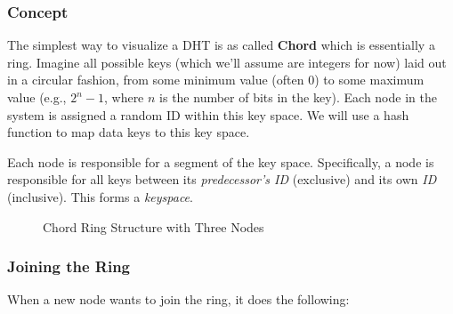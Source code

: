\subsubsection{Concept}

The simplest way to visualize a DHT is as called \textbf{Chord} which is essentially a ring.  Imagine all possible keys (which we'll assume are integers for now) laid out in a circular fashion, from some minimum value (often $0$) to some maximum value (e.g., $2^n - 1$, where $n$ is the number of bits in the key).  Each node in the system is assigned a random ID within this key space. We will use a hash function to map data keys to this key space.

Each node is responsible for a segment of the key space.  Specifically, a node is responsible for all keys between its \textit{predecessor's ID} (exclusive) and its own \textit{ID} (inclusive).  This forms a \textit{keyspace}.

\begin{figure}[h]
\begin{center}
\end{center}
\label{fig:chord_ring}
\caption{Chord Ring Structure with Three Nodes}
\end{figure}

\subsubsection{Joining the Ring}
When a new node wants to join the ring, it does the following:

